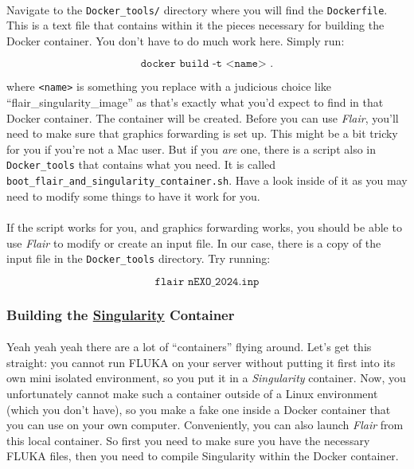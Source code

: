     \paragraph{}
    Navigate to the \texttt{Docker\_tools/} directory where you will find the \texttt{Dockerfile}. This is a text file that contains within it the pieces necessary for building the Docker container. You don't have to do much work here. Simply run:

    \[ \texttt{docker build -t <name> .} \]

    where \texttt{<name>} is something you replace with a judicious choice like ``flair\_singularity\_image'' as that's exactly what you'd expect to find in that Docker container. The container will be created. Before you can use \textit{Flair}, you'll need to make sure that graphics forwarding is set up. This might be a bit tricky for you if you're not a Mac user. But if you \textit{are} one, there is a script also in \texttt{Docker\_tools} that contains what you need. It is called \texttt{boot\_flair\_and\_singularity\_container.sh}. Have a look inside of it as you may need to modify some things to have it work for you.

    \paragraph{}
    If the script works for you, and graphics forwarding works, you should be able to use \textit{Flair} to modify or create an input file. In our case, there is a copy of the input file in the \texttt{Docker\_tools} directory. Try running:
    
    \[\texttt{flair nEXO\_2024.inp}\]

    \subsubsection{Building the \href{https://sylabs.io/singularity/}{Singularity} Container}
    \paragraph{}
    Yeah yeah yeah there are a lot of ``containers'' flying around. Let's get this straight: you cannot run FLUKA on your server without putting it first into its own mini isolated environment, so you put it in a \textit{Singularity} container. Now, you unfortunately cannot make such a container outside of a Linux environment (which you don't have), so you make a fake one inside a Docker container that you can use on your own computer. Conveniently, you can also launch \textit{Flair} from this local container. So first you need to make sure you have the necessary FLUKA files, then you need to compile Singularity within the Docker container.

